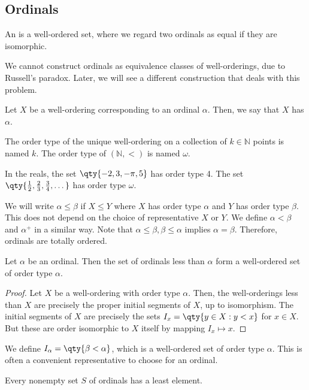 \subsection{Ordinals}
\begin{definition}
    An  is a well-ordered set, where we regard two ordinals as equal if they are isomorphic.
\end{definition}
\begin{remark}
    We cannot construct ordinals as equivalence classes of well-orderings, due to Russell's paradox.
    Later, we will see a different construction that deals with this problem.
\end{remark}
\begin{definition}
    Let $X$ be a well-ordering corresponding to an ordinal $\alpha$.
    Then, we say that $X$ has  $\alpha$.
\end{definition}
The order type of the unique well-ordering on a collection of $k \in \mathbb N$ points is named $k$.
The order type of $(\mathbb N, <)$ is named $\omega$.
\begin{example}
    In the reals, the set $\qty{-2, 3, -\pi, 5}$ has order type 4.
    The set $\qty{\frac{1}{2}, \frac{2}{3}, \frac{3}{4}, \dots}$ has order type $\omega$.
\end{example}
We will write $\alpha \leq \beta$ if $X \leq Y$ where $X$ has order type $\alpha$ and $Y$ has order type $\beta$.
This does not depend on the choice of representative $X$ or $Y$.
We define $\alpha < \beta$ and $\alpha^+$ in a similar way.
Note that $\alpha \leq \beta, \beta \leq \alpha$ implies $\alpha = \beta$.
Therefore, ordinals are totally ordered.
\begin{proposition}
    Let $\alpha$ be an ordinal.
    Then the set of ordinals less than $\alpha$ form a well-ordered set of order type $\alpha$.
\end{proposition}
\begin{proof}
    Let $X$ be a well-ordering with order type $\alpha$.
    Then, the well-orderings less than $X$ are precisely the proper initial segments of $X$, up to isomorphism.
    The initial segments of $X$ are precisely the sets $I_x = \qty{y \in X : y < x}$ for $x \in X$.
    But these are order isomorphic to $X$ itself by mapping $I_x \mapsto x$.
\end{proof}
We define $I_\alpha = \qty{\beta < \alpha}$, which is a well-ordered set of order type $\alpha$.
This is often a convenient representative to choose for an ordinal.
\begin{proposition}
    Every nonempty set $S$ of ordinals has a least element.
\end{proposition}
